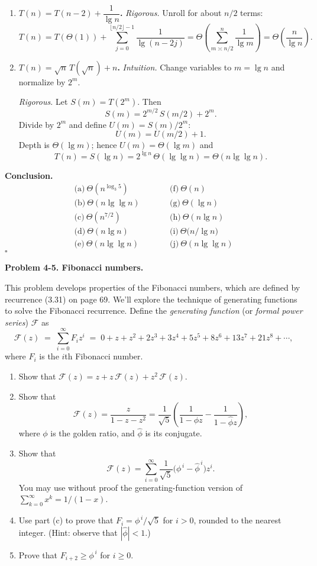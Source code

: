 \documentclass[12pt]{article}
\theoremstyle{definition}
\begin{document}
\begin{enumerate}
\item \textbf{$T(n)=T(n-2)+\dfrac{1}{\lg n}$.}
\emph{Rigorous.} Unroll for about $n/2$ terms:
\[
T(n)=T(\Theta(1))+\sum_{j=0}^{\lfloor n/2\rfloor-1}\frac{1}{\lg(n-2j)}
=\Theta\!\left(\sum_{m\asymp n/2}^{n}\frac{1}{\lg m}\right)=\boxed{\Theta\!\left(\frac{n}{\lg n}\right)}.
\]

\item \textbf{$T(n)=\sqrt{n}\,T(\sqrt{n})+n$.}
\emph{Intuition.} Change variables to $m=\lg n$ and normalize by $2^{m}$.

\emph{Rigorous.} Let $S(m)=T(2^{m})$. Then
\[
S(m)=2^{m/2}\,S(m/2)+2^{m}.
\]
Divide by $2^{m}$ and define $U(m)=S(m)/2^{m}$:
\[
U(m)=U(m/2)+1.
\]
Depth is $\Theta(\lg m)$; hence $U(m)=\Theta(\lg m)$ and
\[
T(n)=S(\lg n)=2^{\lg n}\,\Theta(\lg\lg n)=\boxed{\Theta(n\lg\lg n)}.
\]
\end{enumerate}

\medskip
\noindent\textbf{Conclusion.}
\[
\boxed{
\begin{array}{lcl}
\text{(a)}~\Theta(n^{\log_3 5}) &\qquad& \text{(f)}~\Theta(n)\\
\text{(b)}~\Theta(n\lg\lg n) && \text{(g)}~\Theta(\lg n)\\
\text{(c)}~\Theta(n^{7/2}) && \text{(h)}~\Theta(n\lg n)\\
\text{(d)}~\Theta(n\lg n) && \text{(i)}~\Theta\!\big(n/\lg n\big)\\
\text{(e)}~\Theta(n\lg\lg n) && \text{(j)}~\Theta(n\lg\lg n)
\end{array}}
\]
\hfill$\square$

\newpage

\noindent\textbf{Problem 4-5. Fibonacci numbers.}

\medskip
This problem develops properties of the Fibonacci numbers, which are defined by recurrence (3.31) on page 69. We’ll explore the technique of generating functions to solve the Fibonacci recurrence. Define the \emph{generating function} (or \emph{formal power series}) $\mathcal{F}$ as
\[
\mathcal{F}(z)\;=\;\sum_{i=0}^{\infty}F_i z^i
\;=\;0+z+z^2+2z^3+3z^4+5z^5+8z^6+13z^7+21z^8+\cdots,
\]
where $F_i$ is the $i$th Fibonacci number.

\begin{enumerate}
\item Show that $\mathcal{F}(z)=z+z\,\mathcal{F}(z)+z^2\,\mathcal{F}(z)$.
\item Show that
\[
\mathcal{F}(z)=\frac{z}{1-z-z^2}
=\frac{1}{\sqrt{5}}\!\left(\frac{1}{1-\phi z}-\frac{1}{1-\hat\phi z}\right),
\]
where $\phi$ is the golden ratio, and $\hat\phi$ is its conjugate.
\item Show that
\[
\mathcal{F}(z)=\sum_{i=0}^{\infty}\frac{1}{\sqrt{5}}\big(\phi^{\,i}-\hat\phi^{\,i}\big)z^i.
\]
You may use without proof the generating-function version of $\sum_{k=0}^{\infty}x^k=1/(1-x)$.
\item Use part (c) to prove that $F_i=\phi^{\,i}/\sqrt{5}$ for $i>0$, rounded to the nearest integer. (Hint: observe that $|\hat\phi|<1$.)
\item Prove that $F_{i+2}\ge \phi^{\,i}$ for $i\ge 0$.
\end{enumerate}
\end{document}
